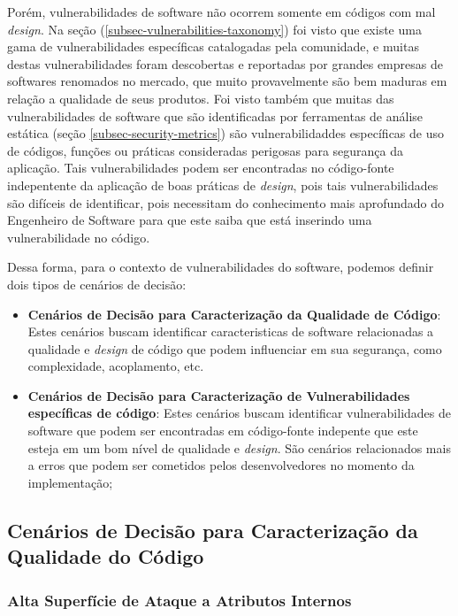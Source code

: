 Porém, vulnerabilidades de software não ocorrem somente em códigos com mal \emph{design}. Na seção (\ref{subsec-vulnerabilities-taxonomy}) foi visto que existe uma gama de vulnerabilidades específicas catalogadas pela comunidade, e muitas destas vulnerabilidades foram descobertas e reportadas por grandes empresas de softwares renomados no mercado, que muito provavelmente são bem maduras em relação a qualidade de seus produtos. Foi visto também que muitas das vulnerabilidades de software que são identificadas por ferramentas de análise estática (seção \ref{subsec-security-metrics}) são vulnerabilidaddes específicas de uso de códigos, funções ou práticas consideradas perigosas para segurança da aplicação. Tais vulnerabilidades podem ser encontradas no código-fonte indepentente da aplicação de boas práticas de \emph{design}, pois tais vulnerabilidades são difíceis de identificar, pois necessitam do conhecimento mais aprofundado do Engenheiro de Software para que este saiba que está inserindo uma vulnerabilidade no código.

Dessa forma, para o contexto de vulnerabilidades do software, podemos definir dois tipos de cenários de decisão:

\begin{itemize}
\item \textbf{Cenários de Decisão para Caracterização da Qualidade de Código}: Estes cenários buscam identificar caracteristicas de software relacionadas a qualidade e \emph{design} de código que podem influenciar em sua segurança, como complexidade, acoplamento, etc.

\item \textbf{Cenários de Decisão para Caracterização de Vulnerabilidades específicas de código}: Estes cenários buscam identificar vulnerabilidades de software que podem ser encontradas em código-fonte indepente que este esteja em um bom nível de qualidade e \emph{design}. São cenários relacionados mais a erros que podem ser cometidos pelos desenvolvedores no momento da implementação;
\end{itemize}


\subsection{Cenários de Decisão para Caracterização da Qualidade do Código }

\subsubsection{Alta Superfície de Ataque a Atributos Internos}

